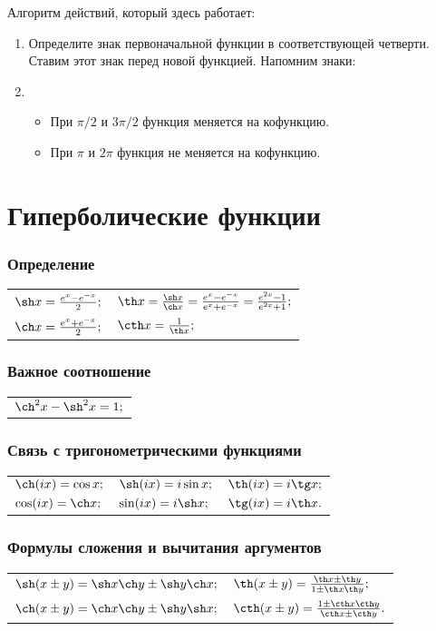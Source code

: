 \normalsize
Алгоритм действий, который здесь работает:
\begin{enumerate}
\item
Определите знак первоначальной функции в соответствующей четверти. Ставим этот знак перед новой функцией. Напомним знаки:
\item
\begin{itemize}
\item 
При $\pi/2$ и $3\pi/2$ функция меняется на кофункцию.
\item
При $\pi$ и $2\pi$ функция не меняется на кофункцию.
\end{itemize}
\end{enumerate}

\section{Гиперболические функции}

\subsubsection{Определение}
\begin{longtable}[l]{l l}
$\sh x = \frac{e^{x}-e^{-x}}{2};$
&
$\th x = \frac{\sh x}{\ch x}=\frac{e^{x}-e^{-x}}{e^{x}+e^{-x}}=\frac{e^{2x}-1}{e^{2x}+1};$
\\
$\ch x = \frac{e^{x}+e^{-x}}{2};$
&
$\cth x = \frac{1}{\th x};$
\end{longtable}

\subsubsection{Важное соотношение}
\begin{longtable}[l]{l}
$\ch^2 x - \sh^2 x = 1;$
\end{longtable}

\subsubsection{Связь с тригонометрическими функциями}
\begin{longtable}[l]{l l l}
$\ch (ix) = \cos x;$
&
$\sh (ix)= i \sin x;$
&
$\th (ix) = i \tg x;$
\\
$\cos (ix) = \ch x;$
&
$\sin (ix) = i \sh x;$
&
$\tg (ix) = i \th x.$
\end{longtable}

\subsubsection{Формулы сложения и вычитания аргументов}
\begin{longtable}[l]{l l}
$\sh (x\pm y) =  \sh x \ch y \pm \sh y \ch x;$
&
$\th (x \pm y) = \frac{\th x \pm \th y}{1 \pm \th x \th y};$
\\
$\ch (x\pm y) =  \ch x \ch y \pm \sh y \sh x;$
&
$\cth (x \pm y) = \frac{1 \pm \cth x \cth y}{\cth x \pm \cth y}.$
\end{longtable}


